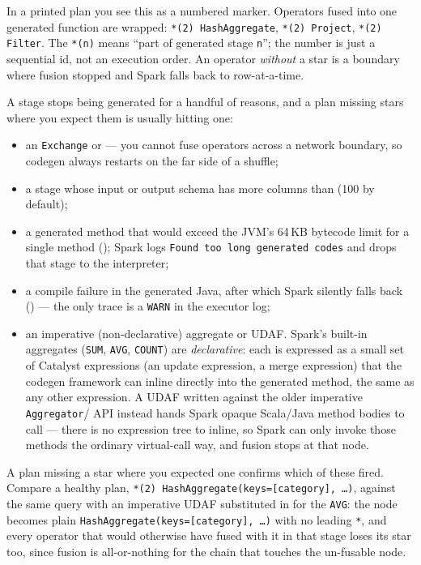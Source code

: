 In a printed plan you see this as a numbered marker. Operators fused into one
generated function are wrapped: \texttt{*(2) HashAggregate}, \texttt{*(2)
Project}, \texttt{*(2) Filter}. The \texttt{*(n)} means ``part of generated stage
\texttt{n}''; the number is just a sequential id, not an execution order. An
operator \emph{without} a star is a boundary where fusion stopped and Spark falls
back to row-at-a-time.

A stage stops being generated for a handful of reasons, and a plan missing stars
where you expect them is usually hitting one:

\begin{itemize}
  \item an \texttt{Exchange} or  --- you cannot fuse
        operators across a network boundary, so codegen always restarts on the
        far side of a shuffle;
  \item a stage whose input or output schema has more columns than
         (100 by default);
  \item a generated method that would exceed the JVM's 64\,KB bytecode limit for
        a single method (); Spark logs
        \texttt{Found too long generated codes} and drops that stage to the
        interpreter;
  \item a compile failure in the generated Java, after which Spark silently falls
        back () --- the only trace is a
        \texttt{WARN} in the executor log;
  \item an imperative (non-declarative) aggregate or UDAF. Spark's built-in
        aggregates (\texttt{SUM}, \texttt{AVG}, \texttt{COUNT}) are
        \emph{declarative}: each is expressed as a small set of Catalyst
        expressions (an update expression, a merge expression) that the
        codegen framework can inline directly into the generated method, the
        same as any other expression. A UDAF written against the older
        imperative \texttt{Aggregator}/
        API instead hands Spark opaque Scala/Java method bodies to call ---
        there is no expression tree to inline, so Spark can only invoke those
        methods the ordinary virtual-call way, and fusion stops at that node.
\end{itemize}

A plan missing a star where you expected one confirms which of these fired.
Compare a healthy plan, \texttt{*(2) HashAggregate(keys=[category], \ldots)},
against the same query with an imperative UDAF substituted in for the
\texttt{AVG}: the node becomes plain \texttt{HashAggregate(keys=[category],
\ldots)} with no leading \texttt{*}, and every operator that would otherwise
have fused with it in that stage loses its star too, since fusion is
all-or-nothing for the chain that touches the un-fusable node.

